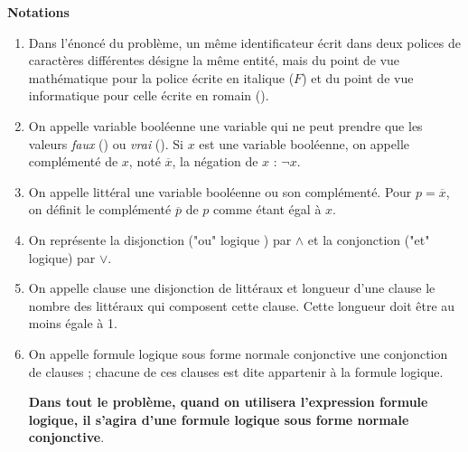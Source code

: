 {\bf Notations}
\begin{enumerate}
\item Dans l’énoncé du problème, un même identificateur écrit dans deux polices de caractères différentes désigne la même entité, mais du point de vue mathématique pour la police écrite en italique ($F$) et du point de vue informatique pour celle écrite en romain ().
\item On appelle variable booléenne une variable qui ne peut prendre que les valeurs {\it faux} () ou {\it vrai} (). Si $x$ est une variable booléenne, on appelle complémenté de $x$,  noté $\overline x$, la négation de $x$ : $\neg x$.
\item On appelle littéral une variable booléenne ou son complémenté. Pour $p = \overline x$, on définit le complémenté $\overline p$ de $p$ comme étant égal à $x$.
\item On représente la disjonction ("ou" logique ) par $\land$ et la conjonction ("et" logique) par $\lor$.
\item On appelle clause une disjonction de littéraux et longueur d’une clause le nombre des littéraux qui composent cette clause. Cette longueur doit être au moins égale à 1.
\item On appelle formule logique sous forme normale conjonctive une conjonction de clauses ; chacune de ces clauses est dite appartenir à la formule logique. 

{\bf Dans tout le problème, quand on utilisera l’expression formule logique, il s’agira d’une formule logique sous forme normale conjonctive}. 


\end{enumerate}
